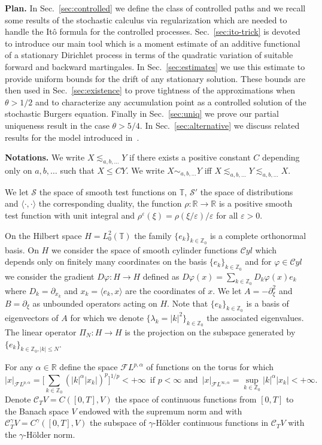 \documentclass[11pt,a4paper,draft,reqno]{amsart}
\newcommand{\TT}{\mathbb{T}}
\newcommand{\RR}{\mathbb{R}}
\newcommand{\ZZ}{\mathbb{Z}}
\newcommand{\cF}{\mathcal{F}}
\newcommand{\Lz}{{L^2_0(\TT)}}
\newcommand{\cS}{\mathcal{S}}
\newcommand{\cC}{\mathcal{C}}
\newcommand{\eps}{\varepsilon}
\newcommand{\cyl}{\mathcal{C}yl}
\begin{document}
\bigskip
\textbf{Plan.} In
Sec.~\ref{sec:controlled} we define the class of controlled paths and we recall some results of the stochastic calculus via regularization which are needed to handle the It\^o formula for the controlled processes.
Sec.~\ref{sec:ito-trick} is devoted to introduce our main tool which is a moment estimate of an additive functional of a stationary Dirichlet process in terms of the quadratic variation of suitable forward and backward martingales. In Sec.~\ref{sec:estimates} we use this estimate to provide uniform bounds for the drift of any stationary solution. These bounds are then used in Sec.~\ref{sec:existence} to prove tightness of the approximations when $\theta > 1/2$ and to characterize any accumulation point as a controlled solution of the stochastic Burgers equation. Finally in Sec.~\ref{sec:uniq} we prove our partial uniqueness result in the case $\theta > 5/4$. In Sec.~\ref{sec:alternative} we discuss related results for the model introduced in~\cite{DDT}.


\bigskip
\textbf{Notations.} We write $X \lesssim_{a,b,\dots} Y$ if there exists a positive constant $C$ depending only on $a,b,\dots$ such that $X \le C Y$. We write $X \sim_{a,b,\dots} Y$ iff $X\lesssim_{a,b,\dots} Y \lesssim_{a,b,\dots} X$. 

We let $\cS$ the space of smooth test functions on $\TT$, $\cS'$ the space of distributions and $\langle \cdot,\cdot\rangle$ the corresponding duality, the function  $\rho:\RR\to\RR$ is a positive smooth test function with unit integral and $\rho^\eps(\xi)=\rho(\xi/\eps)/\eps$ for all $\eps>0$.


On the Hilbert space $H=\Lz$ the family $\{e_k\}_{k\in\ZZ_0}$ is a complete orthonormal basis. On $H$ we consider the space of smooth cylinder functions  $\cyl$ which depends only on finitely many coordinates on the basis $\{e_k\}_{k\in \ZZ_0}$ and for $\varphi \in\cyl$ we consider the gradient $D \varphi : H\to H$ defined as $D \varphi(x) = \sum_{k\in\ZZ_0} D_k \varphi(x) e_k$ where $D_k = \partial_{x_k}$ and  $x_k = \langle e_k,x \rangle$ are the coordinates of $x$.
We let $A=-\partial_\xi^2$ and $B=\partial_\xi$ as  unbounded operators acting on  $H$. Note that $\{e_k\}_{k\in\ZZ_0}$ is a basis of eigenvectors of $A$ for which we denote $\{\lambda_k = |k|^2 \}_{k\in\ZZ_0}$ the associated eigenvalues. 
The linear operator $\Pi_N: H \to H$ is the projection on the subspace generated by $\{e_k\}_{k\in\ZZ_0, |k|\le N}$. 

For any $\alpha\in \RR$ define the space $\cF L^{p,\alpha}$ of functions on the torus for which
$$
|x|_{\cF L^{p,\alpha}} = \big[\sum_{k\in\ZZ_0} (|k|^\alpha |x_k|)^p\big]^{1/p}<+\infty
\, \text{ 
if $p<\infty$ and 
 }\, 
|x|_{\cF L^{\infty,\alpha}} = \sup_{k\in\ZZ_0} |k|^\alpha |x_k| <+\infty .
$$
Denote $\cC_T V = C([0,T],V)$ the space of continuous functions from $[0,T]$ to the Banach space $V$ endowed with the supremum norm and with $\cC^\gamma_T V = C^\gamma([0,T],V)$ the subspace of $\gamma$-H\"older continuous functions in $\cC_T V$ with the $\gamma$-H\"older norm. 
\end{document}
